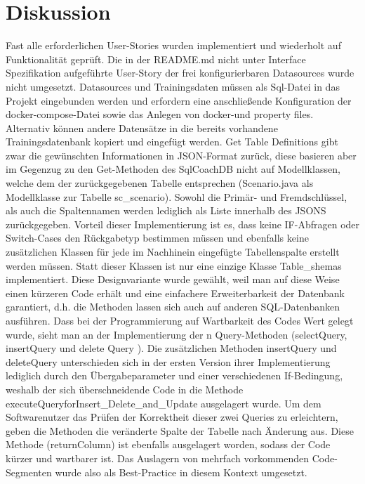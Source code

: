 \documentclass[fleqn,10pt,ngerman]{SelfArx}
\begin{document}
	\section{Diskussion}
		Fast alle  erforderlichen User-Stories wurden implementiert und wiederholt auf Funktionalität geprüft. 
		Die in der README.md nicht unter Interface Spezifikation aufgeführte User-Story der frei konfigurierbaren Datasources wurde nicht umgesetzt. 
		Datasources und Trainingsdaten müssen als Sql-Datei in das Projekt eingebunden werden und erfordern eine anschließende Konfiguration der docker-compose-Datei sowie das Anlegen von docker-und property files. 
		Alternativ können andere Datensätze in die bereits vorhandene Trainingsdatenbank kopiert und eingefügt werden.\newline
		Get Table Definitions gibt zwar die gewünschten Informationen in  JSON-Format zurück, diese basieren aber im Gegenzug zu den Get-Methoden des SqlCoachDB nicht auf Modellklassen, welche dem der zurückgegebenen Tabelle entsprechen (Scenario.java als Modellklasse zur Tabelle sc\_scenario). Sowohl die Primär- und Fremdschlüssel, als auch die Spaltennamen werden lediglich als Liste innerhalb des JSONS zurückgegeben. Vorteil dieser Implementierung ist es, dass keine IF-Abfragen oder Switch-Cases den Rückgabetyp bestimmen müssen und ebenfalls keine zusätzlichen Klassen für jede im Nachhinein eingefügte Tabellenspalte erstellt werden müssen. Statt dieser Klassen ist nur eine einzige Klasse Table\_shemas implementiert.
		Diese Designvariante wurde gewählt, weil man auf diese Weise einen kürzeren Code erhält und eine einfachere Erweiterbarkeit der Datenbank garantiert, d.h. die Methoden lassen sich auch auf anderen SQL-Datenbanken ausführen.
		\newline
		Dass bei der Programmierung auf Wartbarkeit des Codes Wert gelegt wurde, sieht man an der Implementierung der n Query-Methoden (selectQuery, insertQuery und delete Query ).
		Die zusätzlichen Methoden insertQuery und deleteQuery unterschieden sich in der ersten Version ihrer Implementierung lediglich durch den Übergabeparameter und einer verschiedenen If-Bedingung, weshalb der sich überschneidende Code in die Methode executeQueryforInsert\_Delete\_and\_Update ausgelagert wurde.  Um  dem Softwarenutzer das Prüfen der Korrektheit dieser zwei Queries zu erleichtern, geben die Methoden die veränderte Spalte der Tabelle nach Änderung aus. Diese Methode (returnColumn) ist ebenfalls ausgelagert worden, sodass der Code kürzer und wartbarer ist. Das Auslagern von mehrfach vorkommenden Code-Segmenten wurde also als Best-Practice in diesem Kontext umgesetzt. \newline 
\end{document}
